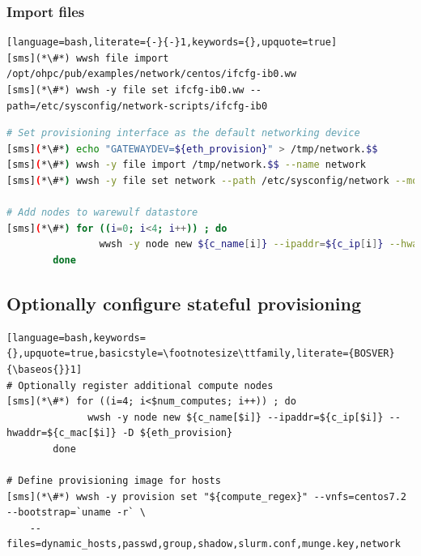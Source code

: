 \documentclass[letterpaper]{article}
\newcommand{\baseos}{centos7.2}
\begin{document}
\subsubsection{Import files} \label{sec:file_import}



\begin{lstlisting}[language=bash,literate={-}{-}1,keywords={},upquote=true]
[sms](*\#*) wwsh file import /opt/ohpc/pub/examples/network/centos/ifcfg-ib0.ww
[sms](*\#*) wwsh -y file set ifcfg-ib0.ww --path=/etc/sysconfig/network-scripts/ifcfg-ib0
\end{lstlisting}




\begin{lstlisting}[language=bash,keywords={},upquote=true,basicstyle=\footnotesize\ttfamily,]
# Set provisioning interface as the default networking device
[sms](*\#*) echo "GATEWAYDEV=${eth_provision}" > /tmp/network.$$
[sms](*\#*) wwsh -y file import /tmp/network.$$ --name network
[sms](*\#*) wwsh -y file set network --path /etc/sysconfig/network --mode=0644 --uid=0

# Add nodes to warewulf datastore
[sms](*\#*) for ((i=0; i<4; i++)) ; do
                wwsh -y node new ${c_name[i]} --ipaddr=${c_ip[i]} --hwaddr=${c_mac[i]} -D ${eth_provision}
        done
\end{lstlisting}

\subsection{Optionally configure stateful provisioning}





\begin{lstlisting}[language=bash,keywords={},upquote=true,basicstyle=\footnotesize\ttfamily,literate={BOSVER}{\baseos{}}1]
# Optionally register additional compute nodes
[sms](*\#*) for ((i=4; i<$num_computes; i++)) ; do
              wwsh -y node new ${c_name[$i]} --ipaddr=${c_ip[$i]} --hwaddr=${c_mac[$i]} -D ${eth_provision}
        done

# Define provisioning image for hosts
[sms](*\#*) wwsh -y provision set "${compute_regex}" --vnfs=centos7.2 --bootstrap=`uname -r` \
    --files=dynamic_hosts,passwd,group,shadow,slurm.conf,munge.key,network 
\end{lstlisting}
\end{document}
